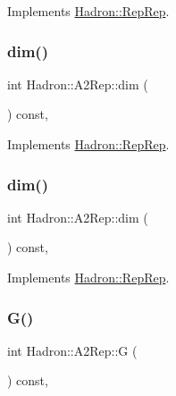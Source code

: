 Implements \mbox{\hyperlink{structHadron_1_1RepRep_a92c8802e5ed7afd7da43ccfd5b7cd92b}{Hadron\+::\+Rep\+Rep}}.

\mbox{\label{structHadron_1_1A2Rep_a17b15564f35f6be6afa4a189806da16b}} 
\subsubsection{\texorpdfstring{dim()}{dim()}\hspace{0.1cm}{\footnotesize\ttfamily [2/3]}}
{\footnotesize\ttfamily int Hadron\+::\+A2\+Rep\+::dim (\begin{DoxyParamCaption}{ }\end{DoxyParamCaption}) const\hspace{0.3cm}{\ttfamily [inline]}, {\ttfamily [virtual]}}



Implements \mbox{\hyperlink{structHadron_1_1RepRep_a92c8802e5ed7afd7da43ccfd5b7cd92b}{Hadron\+::\+Rep\+Rep}}.

\mbox{\label{structHadron_1_1A2Rep_a17b15564f35f6be6afa4a189806da16b}} 
\subsubsection{\texorpdfstring{dim()}{dim()}\hspace{0.1cm}{\footnotesize\ttfamily [3/3]}}
{\footnotesize\ttfamily int Hadron\+::\+A2\+Rep\+::dim (\begin{DoxyParamCaption}{ }\end{DoxyParamCaption}) const\hspace{0.3cm}{\ttfamily [inline]}, {\ttfamily [virtual]}}



Implements \mbox{\hyperlink{structHadron_1_1RepRep_a92c8802e5ed7afd7da43ccfd5b7cd92b}{Hadron\+::\+Rep\+Rep}}.

\mbox{\label{structHadron_1_1A2Rep_a6c2da481eeb98634c640e8f17a569eea}} 
\subsubsection{\texorpdfstring{G()}{G()}\hspace{0.1cm}{\footnotesize\ttfamily [1/2]}}
{\footnotesize\ttfamily int Hadron\+::\+A2\+Rep\+::G (\begin{DoxyParamCaption}{ }\end{DoxyParamCaption}) const\hspace{0.3cm}{\ttfamily [inline]}, {\ttfamily [virtual]}}

